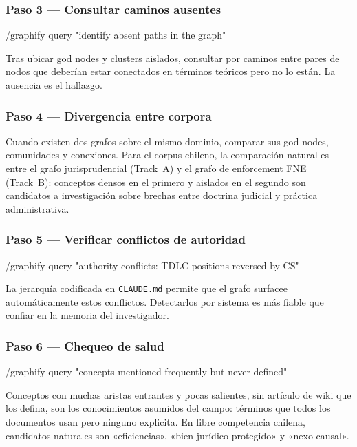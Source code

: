 \documentclass[12pt,a4paper]{article}
\begin{document}
\subsubsection*{Paso 3 — Consultar caminos ausentes}

\begin{codebox}
/graphify query "identify absent paths in the graph"
\end{codebox}

Tras ubicar god nodes y clusters aislados, consultar por caminos entre pares de
nodos que deberían estar conectados en términos teóricos pero no lo están. La
ausencia es el hallazgo.

\subsubsection*{Paso 4 — Divergencia entre corpora}

Cuando existen dos grafos sobre el mismo dominio, comparar sus god nodes,
comunidades y conexiones. Para el corpus chileno, la comparación natural es
entre el grafo jurisprudencial (Track~A) y el grafo de enforcement FNE
(Track~B): conceptos densos en el primero y aislados en el segundo son
candidatos a investigación sobre brechas entre doctrina judicial y práctica
administrativa.

\subsubsection*{Paso 5 — Verificar conflictos de autoridad}

\begin{codebox}
/graphify query "authority conflicts: TDLC positions reversed by CS"
\end{codebox}

La jerarquía codificada en \texttt{CLAUDE.md} permite que el grafo surfacee
automáticamente estos conflictos. Detectarlos por sistema es más fiable que
confiar en la memoria del investigador.

\subsubsection*{Paso 6 — Chequeo de salud}

\begin{codebox}
/graphify query "concepts mentioned frequently but never defined"
\end{codebox}

Conceptos con muchas aristas entrantes y pocas salientes, sin artículo de wiki
que los defina, son los conocimientos asumidos del campo: términos que todos los
documentos usan pero ninguno explicita. En libre competencia chilena, candidatos
naturales son «eficiencias», «bien jurídico protegido» y «nexo causal».
\end{document}
